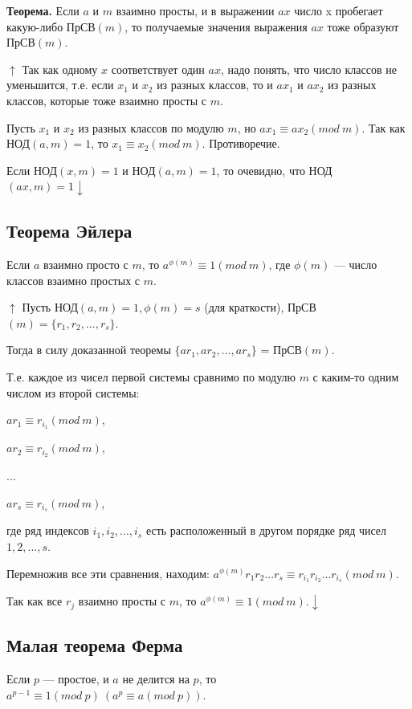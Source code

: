 \documentclass{article}
\begin{document}
        	\textbf{Теорема.} Если $a$ и $m$ взаимно просты, и в выражении $ax$ число x пробегает какую-либо ПрСВ$(m)$, то получаемые значения выражения $ax$ тоже образуют ПрСВ$(m)$.
            
            $\uparrow$ Так как одному $x$ соответствует один $ax$, надо понять, что число классов не уменьшится, т.е. если $x_1$ и $x_2$ из разных классов, то и $ax_1$ и $ax_2$ из разных классов, которые тоже взаимно просты с $m$.
            
            Пусть $x_1$ и $x_2$ из разных классов по модулю $m$, но $ax_1 \equiv ax_2(mod\ m)$. Так как НОД$(a, m) = 1$, то $x_1 \equiv x_2(mod\ m)$. Противоречие.
            
            Если НОД$(x, m) = 1$ и НОД$(a, m) = 1$, то очевидно, что НОД$(ax, m) = 1 \downarrow$
        
        \subsection{Теорема Эйлера}
			Если $a$ взаимно просто с $m$, то $a^{\phi(m)} \equiv 1(mod\ m)$, где $\phi(m)$ --- число классов взаимно простых с $m$.
            
            $\uparrow$ Пусть НОД$(a, m) = 1, \phi(m) = s$ (для краткости), ПрСВ$(m)=\{r_1, r_2, ..., r_s\}$.
            
            Тогда в силу доказанной теоремы $\{ar_1, ar_2, ..., ar_s\}$ = ПрСВ$(m)$.
            
            Т.е. каждое из чисел первой системы сравнимо по модулю $m$ с каким-то одним числом из второй системы:
            
            $ar_1 \equiv r_{i_1}(mod\ m)$,
            
            $ar_2 \equiv r_{i_2}(mod\ m)$,
            
            ...
            
            $ar_s \equiv r_{i_s}(mod\ m)$,
            
            где ряд индексов $i_1, i_2, ..., i_s$ есть расположенный в другом порядке ряд чисел $1, 2, ..., s$.
            
            Перемножив все эти сравнения, находим: $a^{\phi(m)}r_1r_2...r_s \equiv r_{i_1}r_{i_2}...r_{i_s}(mod\ m)$.
            
            Так как все $r_j$ взаимно просты с $m$, то $a^{\phi(m)} \equiv 1(mod\ m). \downarrow$
            
        \subsection{Малая теорема Ферма}
        	Если $p$ --- простое, и $a$ не делится на $p$, то $a^{p-1} \equiv 1(mod\ p)\ (a^p \equiv a(mod\ p)).$      
            
\end{document}
